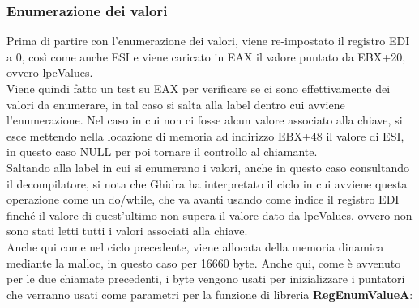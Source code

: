 \documentclass[12pt]{extarticle}
\begin{document}
\subsubsection{Enumerazione dei valori}
Prima di partire con l'enumerazione dei valori, viene re-impostato il registro EDI a 0, così come anche ESI e viene caricato in EAX il valore puntato da EBX+20, ovvero \textsf{lpcValues}.\\ Viene quindi fatto un test su EAX per verificare se ci sono effettivamente dei valori da enumerare, in tal caso si salta alla label dentro cui avviene l'enumerazione. Nel caso in cui non ci fosse alcun valore associato alla chiave, si esce mettendo nella locazione di memoria ad indirizzo EBX+48 il valore di ESI, in questo caso NULL per poi tornare il controllo al chiamante.\\
Saltando alla label in cui si enumerano i valori, anche in questo caso consultando il decompilatore, si nota che Ghidra ha interpretato il ciclo in cui avviene questa operazione come un do/while, che va avanti usando come indice il registro EDI finché il valore di quest'ultimo non supera il valore dato da \textsf{lpcValues}, ovvero non sono stati letti tutti i valori associati alla chiave.\\ Anche qui come nel ciclo precedente, viene allocata della memoria dinamica mediante la malloc, in questo caso per 16660 byte. Anche qui, come è avvenuto per le due chiamate precedenti, i byte vengono usati per inizializzare i puntatori che verranno usati come parametri per la funzione di libreria \textbf{RegEnumValueA}:
\end{document}
